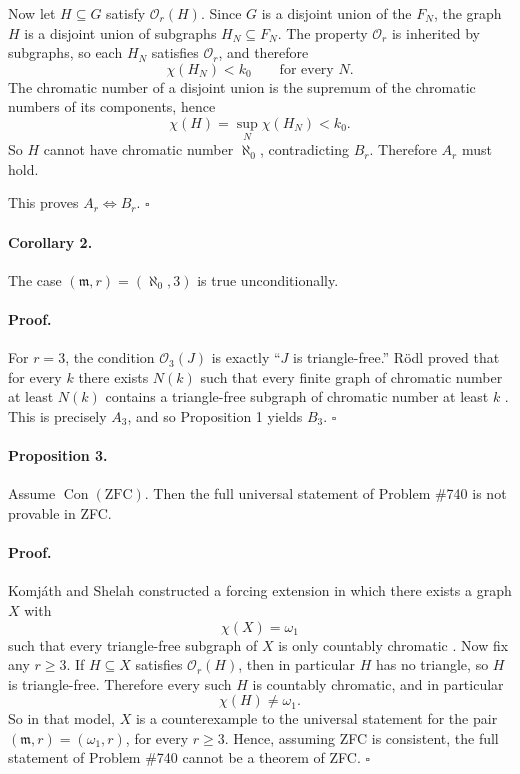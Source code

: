 Now let $H\subseteq G$ satisfy $\mathcal O_r(H)$. Since $G$ is a disjoint union of the $F_N$, the graph $H$ is a disjoint union of subgraphs $H_N\subseteq F_N$. The property $\mathcal O_r$ is inherited by subgraphs, so each $H_N$ satisfies $\mathcal O_r$, and therefore
\[
\chi(H_N)<k_0 \qquad \text{for every } N.
\]
The chromatic number of a disjoint union is the supremum of the chromatic numbers of its components, hence
\[
\chi(H)=\sup_N \chi(H_N) < k_0.
\]
So $H$ cannot have chromatic number $\aleph_0$, contradicting $B_r$. Therefore $A_r$ must hold.

This proves $A_r\Longleftrightarrow B_r$. \hfill $\square$

\paragraph{Corollary 2.} The case $(\mathfrak m,r)=(\aleph_0,3)$ is true unconditionally.

\paragraph{Proof.}
For $r=3$, the condition $\mathcal O_3(J)$ is exactly ``$J$ is triangle-free.'' Rödl proved that for every $k$ there exists $N(k)$ such that every finite graph of chromatic number at least $N(k)$ contains a triangle-free subgraph of chromatic number at least $k$ \cite{Rodl77}. This is precisely $A_3$, and so Proposition 1 yields $B_3$. \hfill $\square$

\paragraph{Proposition 3.} Assume $\operatorname{Con}(\mathrm{ZFC})$. Then the full universal statement of Problem \#740 is not provable in ZFC.

\paragraph{Proof.}
Komj\'{a}th and Shelah constructed a forcing extension in which there exists a graph $X$ with
\[
\chi(X)=\omega_1
\]
such that every triangle-free subgraph of $X$ is only countably chromatic \cite{KomjathShelah88}.
Now fix any $r\ge 3$. If $H\subseteq X$ satisfies $\mathcal O_r(H)$, then in particular $H$ has no triangle, so $H$ is triangle-free. Therefore every such $H$ is countably chromatic, and in particular
\[
\chi(H)\neq \omega_1.
\]
So in that model, $X$ is a counterexample to the universal statement for the pair $(\mathfrak m,r)=(\omega_1,r)$, for every $r\ge 3$.
Hence, assuming ZFC is consistent, the full statement of Problem \#740 cannot be a theorem of ZFC.
\hfill $\square$

